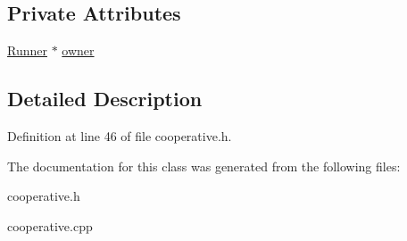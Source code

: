 \subsection*{Private Attributes}
\begin{CompactItemize}
\item 
\hypertarget{classCooperative_7604f094479d08154ede4996a45bf79e}{
\hyperlink{classRunner}{Runner} $\ast$ \hyperlink{classCooperative_7604f094479d08154ede4996a45bf79e}{owner}}
\label{classCooperative_7604f094479d08154ede4996a45bf79e}

\end{CompactItemize}


\subsection{Detailed Description}




Definition at line 46 of file cooperative.h.

The documentation for this class was generated from the following files:\begin{CompactItemize}
\item 
cooperative.h\item 
cooperative.cpp\end{CompactItemize}
